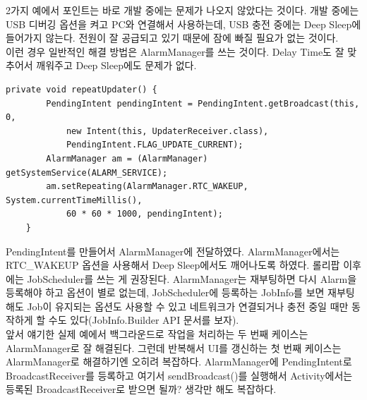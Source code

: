 2가지 예에서 포인트는 바로 개발 중에는 문제가 나오지 않았다는 것이다.
개발 중에는 USB 디버깅 옵션을 켜고 PC와 연결해서 사용하는데, USB 충전 중에는 Deep Sleep에 들어가지 않는다. 
전원이 잘 공급되고 있기 때문에 잠에 빠질 필요가 없는 것이다.\\

이런 경우 일반적인 해결 방법은 AlarmManager를 쓰는 것이다. Delay Time도 잘 맞추어서 깨워주고 Deep Sleep에도 문제가 없다.
\begin{lstlisting}[frame=single]
	private void repeatUpdater() {
		PendingIntent pendingIntent = PendingIntent.getBroadcast(this, 0, 
			new Intent(this, UpdaterReceiver.class), 
			PendingIntent.FLAG_UPDATE_CURRENT);
		AlarmManager am = (AlarmManager) getSystemService(ALARM_SERVICE);
		am.setRepeating(AlarmManager.RTC_WAKEUP, System.currentTimeMillis(), 
			60 * 60 * 1000, pendingIntent);
	}
\end{lstlisting}
PendingIntent를 만들어서 AlarmManager에 전달하였다. AlarmManager에서는 RTC\_WAKEUP 옵션을 사용해서 Deep Sleep에서도 깨어나도록 하였다. 
롤리팝 이후에는 JobScheduler를 쓰는 게 권장된다. 
AlarmManager는 재부팅하면 다시 Alarm을 등록해야 하고 옵션이 별로 없는데, JobScheduler에 등록하는 JobInfo를 보면 재부팅해도 Job이 유지되는 옵션도 사용할 수 있고 네트워크가 연결되거나 충전 중일 때만 동작하게 할 수도 있다(JobInfo.Builder API 문서를 보자).\\

앞서 얘기한 실제 예에서 백그라운드로 작업을 처리하는 두 번째 케이스는 AlarmManager로 잘 해결된다. 
그런데 반복해서 UI를 갱신하는 첫 번째 케이스는 AlarmManager로 해결하기엔 오히려 복잡하다. 
AlarmManager에 PendingIntent로 BroadcastReceiver를 등록하고 여기서 sendBroadcast()를 실행해서 Activity에서는 등록된 BroadcastReceiver로 받으면 될까? 생각만 해도 복잡하다.\\

